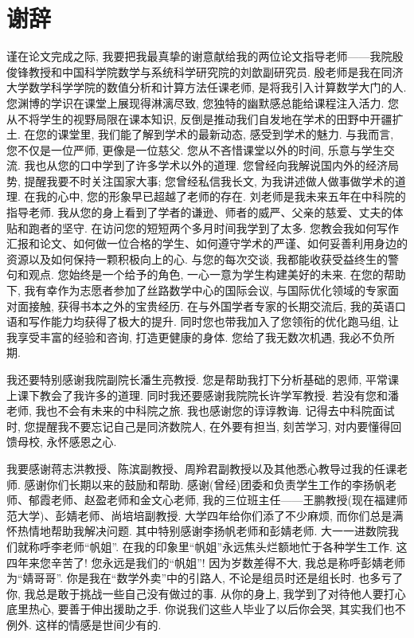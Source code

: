 \documentclass[UTF8,10.5pt,a4paper]{ctexart}
\theoremstyle{definition}
\theoremstyle{definition}
\begin{document}
\section*{谢辞}
谨在论文完成之际, 我要把我最真挚的谢意献给我的两位论文指导老师——我院殷俊锋教授和中国科学院数学与系统科学研究院的刘歆副研究员. 殷老师是我在同济大学数学科学学院的数值分析和计算方法任课老师, 是将我引入计算数学大门的人. 您渊博的学识在课堂上展现得淋漓尽致, 您独特的幽默感总能给课程注入活力. 您从不将学生的视野局限在课本知识, 反倒是推动我们自发地在学术的田野中开疆扩土. 在您的课堂里, 我们能了解到学术的最新动态, 感受到学术的魅力. 与我而言, 您不仅是一位严师, 更像是一位慈父. 您从不吝惜课堂以外的时间, 乐意与学生交流. 我也从您的口中学到了许多学术以外的道理. 您曾经向我解说国内外的经济局势, 提醒我要不时关注国家大事; 您曾经私信我长文, 为我讲述做人做事做学术的道理. 在我的心中, 您的形象早已超越了老师的存在. 刘老师是我未来五年在中科院的指导老师. 我从您的身上看到了学者的谦逊、师者的威严、父亲的慈爱、丈夫的体贴和跑者的坚守. 在访问您的短短两个多月时间我学到了太多. 您教会我如何写作汇报和论文、如何做一位合格的学生、如何遵守学术的严谨、如何妥善利用身边的资源以及如何保持一颗积极向上的心. 与您的每次交谈, 我都能收获受益终生的警句和观点. 您始终是一个给予的角色, 一心一意为学生构建美好的未来. 在您的帮助下, 我有幸作为志愿者参加了丝路数学中心的国际会议, 与国际优化领域的专家面对面接触, 获得书本之外的宝贵经历. 在与外国学者专家的长期交流后, 我的英语口语和写作能力均获得了极大的提升. 同时您也带我加入了您领衔的优化跑马组, 让我享受丰富的经验和咨询, 打造更健康的身体. 您给了我无数次机遇, 我必不负所期.
\par 我还要特别感谢我院副院长潘生亮教授. 您是帮助我打下分析基础的恩师, 平常课上课下教会了我许多的道理. 同时我还要感谢我院院长许学军教授. 若没有您和潘老师, 我也不会有未来的中科院之旅. 我也感谢您的谆谆教诲. 记得去中科院面试时, 您提醒我不要忘记自己是同济数院人, 在外要有担当, 刻苦学习, 对内要懂得回馈母校, 永怀感恩之心. 
\par 我要感谢蒋志洪教授、陈滨副教授、周羚君副教授以及其他悉心教导过我的任课老师. 感谢你们长期以来的鼓励和帮助. 感谢(曾经)团委和负责学生工作的李扬帆老师、郁霞老师、赵盈老师和金文心老师, 我的三位班主任——王鹏教授(现在福建师范大学)、彭婧老师、尚培培副教授. 大学四年给你们添了不少麻烦, 而你们总是满怀热情地帮助我解决问题. 其中特别感谢李扬帆老师和彭婧老师. 大一一进数院我们就称呼李老师``帆姐''. 在我的印象里``帆姐''永远焦头烂额地忙于各种学生工作. 这四年来您辛苦了! 您永远是我们的``帆姐''! 因为岁数差得不大, 我总是称呼彭婧老师为``婧哥哥''. 你是我在``数学外卖''中的引路人, 不论是组员时还是组长时. 也多亏了你, 我总是敢于挑战一些自己没有做过的事. 从你的身上, 我学到了对待他人要打心底里热心, 要善于伸出援助之手. 你说我们这些人毕业了以后你会哭, 其实我们也不例外. 这样的情感是世间少有的.
\end{document}
